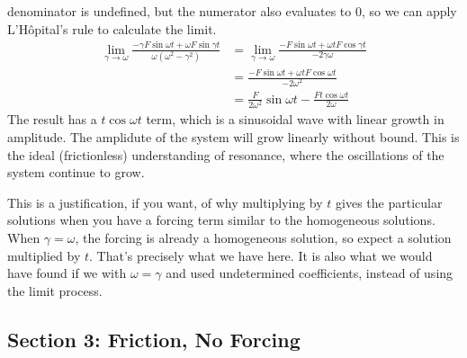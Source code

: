 \documentclass[fleqn,letterpaper]{report}
\begin{document}
denominator is undefined, but the numerator also evaluates to
$0$, so we can apply L'H\^opital's rule to calculate the
limit.
\begin{align*}
\lim_{\gamma \rightarrow \omega} \frac{-\gamma F \sin \omega t +
\omega F \sin \gamma t}{\omega (\omega^2 - \gamma^2)} 
& = \lim_{\gamma \rightarrow \omega} \frac{-F \sin \omega t +
\omega t F \cos \gamma t}{-2\gamma \omega} \\
& = \frac{-F \sin \omega t + \omega t F \cos \omega t}{-2
\omega^2} \\
& = \frac{F}{2\omega^2} \sin \omega t - \frac{Ft \cos \omega
t}{2\omega}
\end{align*}
The result has a $t \cos \omega t$ term, which is a sinusoidal
wave with linear growth in amplitude. The amplidute of the
system will grow linearly without bound. This is the ideal
(frictionless) understanding of resonance, where the
oscillations of the system continue to grow.

This is a justification, if you want, of why multiplying
by $t$ gives the particular solutions when you have a forcing
term similar to the homogeneous solutions. When $\gamma =
\omega$, the forcing is already a homogeneous solution, so
expect a solution multiplied by $t$. That's precisely what we
have here. It is also what we would have found if we with
$\omega = \gamma$ and used undetermined coefficients, instead
of using the limit process.

\subsection{Section 3: Friction, No Forcing}
\label{friction-no-forcing}
\end{document}
